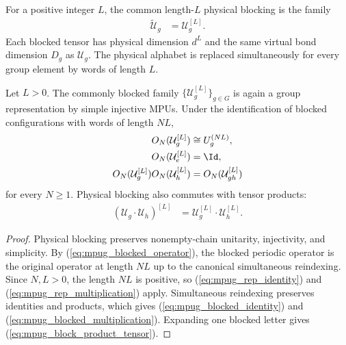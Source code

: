 \begin{definition}
    \label{def:mpug_common_blocking}
    \leanok
    For a positive integer $L$, the common length-$L$ physical blocking is the
    family
    \begin{align}
        \widetilde{\mathcal U}_g & =\mathcal U_g^{[L]}.
        \label{eq:mpug_common_blocked_family}
    \end{align}
    Each blocked tensor has physical dimension $d^L$ and the same virtual bond
    dimension $D_g$ as $\mathcal U_g$. The physical alphabet is replaced
    simultaneously for every group element by words of length $L$.
\end{definition}

\begin{lemma}
    \label{thm:mpug_common_blocking_representation}
    \leanok
    Let $L>0$. The commonly blocked family
    $\{\mathcal U_g^{[L]}\}_{g\in G}$ is again a group representation by simple
    injective MPUs. Under the identification of blocked
    configurations with words of length $NL$,
    \begin{align}
        O_N(\mathcal U_g^{[L]})
         & \cong U_g^{(NL)},
        \label{eq:mpug_blocked_operator} \\
        O_N(\mathcal U_e^{[L]})
         & =\Id,
        \label{eq:mpug_blocked_identity} \\
        O_N(\mathcal U_g^{[L]})O_N(\mathcal U_h^{[L]})
         & =O_N(\mathcal U_{gh}^{[L]})
        \label{eq:mpug_blocked_multiplication}
    \end{align}
    for every $N\geq1$. Physical blocking also commutes with tensor products:
    \begin{align}
        (\mathcal U_g\mathbin{\cdot}\mathcal U_h)^{[L]}
         & =\mathcal U_g^{[L]}\mathbin{\cdot}\mathcal U_h^{[L]}.
        \label{eq:mpug_block_product_tensor}
    \end{align}
\end{lemma}

\begin{proof}\leanok
    Physical blocking preserves nonempty-chain unitarity, injectivity, and
    simplicity. By (\ref{eq:mpug_blocked_operator}), the blocked periodic operator is
    the original operator at length $NL$ up to the canonical simultaneous reindexing.
    Since $N,L>0$,
    the length $NL$ is positive, so (\ref{eq:mpug_rep_identity}) and
    (\ref{eq:mpug_rep_multiplication}) apply. Simultaneous reindexing preserves
    identities and products, which gives (\ref{eq:mpug_blocked_identity}) and
    (\ref{eq:mpug_blocked_multiplication}). Expanding one blocked letter gives
    (\ref{eq:mpug_block_product_tensor}).
\end{proof}

